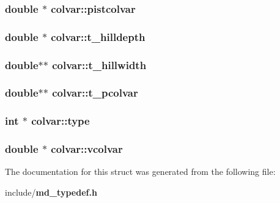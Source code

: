\subsubsection{\setlength{\rightskip}{0pt plus 5cm}double $\ast$ {\bf colvar::pistcolvar}}\label{structcolvar_68434b8074de1a9c6f9c87913683a332}


\subsubsection{\setlength{\rightskip}{0pt plus 5cm}double $\ast$ {\bf colvar::t\_\-hilldepth}}\label{structcolvar_8472fbb024699bb049c1960da84e4d60}


\subsubsection{\setlength{\rightskip}{0pt plus 5cm}double$\ast$$\ast$ {\bf colvar::t\_\-hillwidth}}\label{structcolvar_602a28fc1fbfacf74cebd8e655ca0f36}


\subsubsection{\setlength{\rightskip}{0pt plus 5cm}double$\ast$$\ast$ {\bf colvar::t\_\-pcolvar}}\label{structcolvar_bb751ef3137ae2654ee5bd07c7e2372b}


\subsubsection{\setlength{\rightskip}{0pt plus 5cm}int $\ast$ {\bf colvar::type}}\label{structcolvar_c90dbc9c9be296a675c9cf0259bcf3d5}


\subsubsection{\setlength{\rightskip}{0pt plus 5cm}double $\ast$ {\bf colvar::vcolvar}}\label{structcolvar_298123271567f4043c2973c4159d1ae4}




The documentation for this struct was generated from the following file:\begin{CompactItemize}
\item 
include/{\bf md\_\-typedef.h}\end{CompactItemize}
